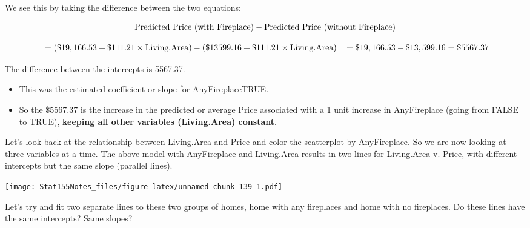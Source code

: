 \documentclass[]{book}
\newenvironment{Shaded}{\begin{snugshade}}{\end{snugshade}}
\newcommand{\DataTypeTok}[1]{\textcolor[rgb]{0.13,0.29,0.53}{#1}}
\newcommand{\KeywordTok}[1]{\textcolor[rgb]{0.13,0.29,0.53}{\textbf{#1}}}
\newcommand{\NormalTok}[1]{#1}
\newcommand{\OperatorTok}[1]{\textcolor[rgb]{0.81,0.36,0.00}{\textbf{#1}}}
\newcommand{\OtherTok}[1]{\textcolor[rgb]{0.56,0.35,0.01}{#1}}
\newcommand{\StringTok}[1]{\textcolor[rgb]{0.31,0.60,0.02}{#1}}
\begin{document}
We see this by taking the difference between the two equations:

\[ \hbox{Predicted Price (with Fireplace)} - \hbox{Predicted Price (without Fireplace)} \]

\begin{align*}
\,&= (\$19,166.53 + \$111.21 \times \hbox{Living.Area}) - ( \$13599.16 + \$111.21 \times \hbox{Living.Area})
\,&= \$19,166.53 - \$13,599.16 = \$5567.37
\end{align*}

The difference between the intercepts is 5567.37.

\begin{itemize}
\item
  This was the estimated coefficient or slope for AnyFireplaceTRUE.
\item
  So the \$5567.37 is the increase in the predicted or average Price associated with a 1 unit increase in AnyFireplace (going from FALSE to TRUE), \textbf{keeping all other variables (Living.Area) constant}.
\end{itemize}

Let's look back at the relationship between Living.Area and Price and color the scatterplot by AnyFireplace. So we are now looking at three variables at a time. The above model with AnyFireplace and Living.Area results in two lines for Living.Area v. Price, with different intercepts but the same slope (parallel lines).

\begin{Shaded}
\end{Shaded}

\texttt{[image: Stat155Notes\_files/figure-latex/unnamed-chunk-139-1.pdf]}

Let's try and fit two separate lines to these two groups of homes, home with any fireplaces and home with no fireplaces. Do these lines have the same intercepts? Same slopes?

\begin{Shaded}
\end{Shaded}
\end{document}
